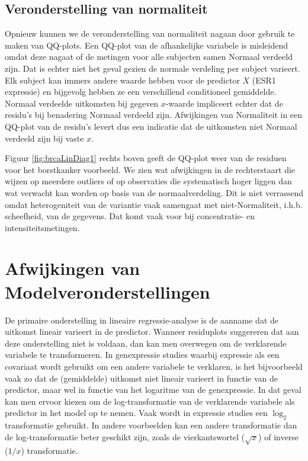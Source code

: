 \documentclass[
  12pt,dutch]{book}
\theoremstyle{definition}
\theoremstyle{definition}
\theoremstyle{definition}
\theoremstyle{definition}
\theoremstyle{remark}
\begin{document}
\subsection{Veronderstelling van normaliteit}\label{veronderstelling-van-normaliteit}

Opnieuw kunnen we de veronderstelling van normaliteit nagaan door gebruik te maken van QQ-plots. Een QQ-plot van de afhankelijke variabele is misleidend omdat deze nagaat of de metingen voor alle subjecten samen Normaal verdeeld zijn. Dat is echter niet het geval gezien de normale verdeling per subject varieert.
Elk subject kan immers andere waarde hebben voor de predictor \(X\) (ESR1 expressie) en bijgevolg hebben ze een verschillend conditioneel gemiddelde.
Normaal verdeelde uitkomsten bij gegeven \(x\)-waarde impliceert echter dat de
residu's bij benadering Normaal verdeeld zijn.
Afwijkingen van Normaliteit in een QQ-plot van de residu's levert dus een indicatie dat de uitkomsten niet Normaal
verdeeld zijn bij vaste \(x\).

Figuur \ref{fig:brcaLinDiag1} rechts boven geeft de QQ-plot weer van de residuen voor het borstkanker voorbeeld.
We zien wat afwijkingen in de rechterstaart die wijzen op meerdere outliers of op observaties die systematisch hoger liggen dan wat verwacht kan worden op basis van de normaalverdeling.
Dit is niet verrassend omdat heterogeniteit van de variantie vaak samengaat met niet-Normaliteit, i.h.b. scheefheid, van de gegevens.
Dat komt vaak voor bij concentratie- en intensiteitsmetingen.

\section{Afwijkingen van Modelveronderstellingen}\label{afwijkingen-van-modelveronderstellingen}

De primaire onderstelling in lineaire regressie-analyse is de aanname dat de uitkomst lineair varieert in de predictor.
Wanneer residuplots suggereren dat aan deze onderstelling niet is voldaan, dan kan men overwegen om de verklarende variabele te transformeren. In genexpressie studies waarbij expressie als een covariaat wordt gebruikt om een andere variabele te verklaren, is het bijvoorbeeld vaak zo dat de (gemiddelde) uitkomst niet lineair varieert in functie van de predictor, maar wel in functie van het logaritme van de genexpressie. In dat geval kan men ervoor kiezen om de log-transformatie van de verklarende variabele als predictor in het model op te nemen. Vaak wordt in expressie studies een \(\log_2\) transformatie gebruikt. In andere voorbeelden kan een andere transformatie dan de
log-transformatie beter geschikt zijn, zoals de vierkantswortel (\(\sqrt{x}\)) of inverse (\(1/x\)) transformatie.
\end{document}
